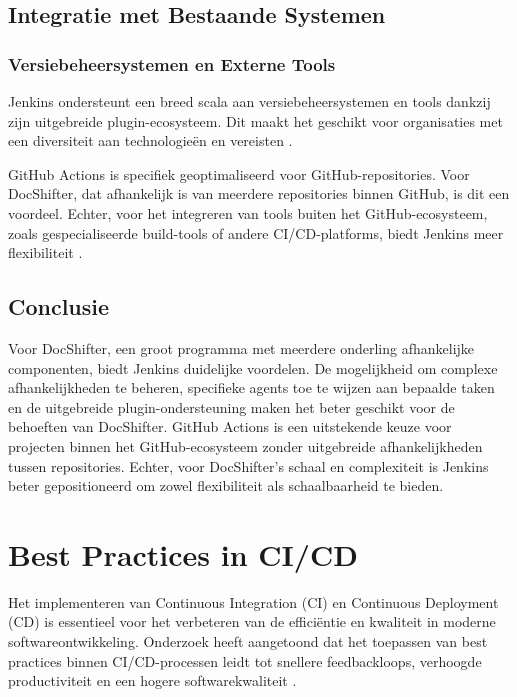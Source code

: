 \subsection{Integratie met Bestaande Systemen}

\subsubsection{Versiebeheersystemen en Externe Tools}

Jenkins ondersteunt een breed scala aan versiebeheersystemen en tools dankzij zijn uitgebreide plugin-ecosysteem. Dit maakt het geschikt voor organisaties met een diversiteit aan technologieën en vereisten \autocite{githubdocs2023actions}.

GitHub Actions is specifiek geoptimaliseerd voor GitHub-repositories. Voor DocShifter, dat afhankelijk is van meerdere repositories binnen GitHub, is dit een voordeel. Echter, voor het integreren van tools buiten het GitHub-ecosysteem, zoals gespecialiseerde build-tools of andere CI/CD-platforms, biedt Jenkins meer flexibiliteit \autocite{spacelift2023}.

\subsection{Conclusie}

Voor DocShifter, een groot programma met meerdere onderling afhankelijke componenten, biedt Jenkins duidelijke voordelen. De mogelijkheid om complexe afhankelijkheden te beheren, specifieke agents toe te wijzen aan bepaalde taken en de uitgebreide plugin-ondersteuning maken het beter geschikt voor de behoeften van DocShifter. GitHub Actions is een uitstekende keuze voor projecten binnen het GitHub-ecosysteem zonder uitgebreide afhankelijkheden tussen repositories. Echter, voor DocShifter’s schaal en complexiteit is Jenkins beter gepositioneerd om zowel flexibiliteit als schaalbaarheid te bieden.


\section{Best Practices in CI/CD}

Het implementeren van Continuous Integration (CI) en Continuous Deployment (CD) is essentieel voor het verbeteren van de efficiëntie en kwaliteit in moderne softwareontwikkeling. Onderzoek heeft aangetoond dat het toepassen van best practices binnen CI/CD-processen leidt tot snellere feedbackloops, verhoogde productiviteit en een hogere softwarekwaliteit \autocite{shahin2017}.

